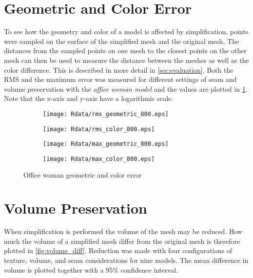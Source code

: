 \section{Geometric and Color Error}
To see how the geometry and color of a model is affected by simplification, points were sampled on the surface of the simplified mesh and the original mesh. The distances from the sampled points on one mesh to the closest points on the other mesh can then be used to measure the distance between the meshes as well as the color difference. This is described in more detail in \cref{sec:evaluation}. Both the RMS and the maximum error was measured for different settings of seam and volume preservation with the \emph{office woman model} and the values are plotted in \cref{fig:geo_col_error}. Note that the x-axis and y-axis have a logarithmic scale.

\begin{figure}[ht]
  \centering
  \begin{subfigure}[b]{.49\textwidth}
    \texttt{[image: Rdata/rms\_geometric\_800.eps]}
  \end{subfigure}
  \hfill
  \begin{subfigure}[b]{.49\textwidth}
    \texttt{[image: Rdata/rms\_color\_800.eps]}
  \end{subfigure}

  \begin{subfigure}[b]{.49\textwidth}
    \texttt{[image: Rdata/max\_geometric\_800.eps]}
  \end{subfigure}
  \hfill
  \begin{subfigure}[b]{.49\textwidth}
    \texttt{[image: Rdata/max\_color\_800.eps]}
  \end{subfigure}
  \caption{Office woman geometric and color error}
  \label{fig:geo_col_error}
\end{figure}

\clearpage
        
\section{Volume Preservation}
When simplification is performed the volume of the mesh may be reduced. How much the volume of a simplified mesh differ from the original mesh is therefore plotted in \cref{fig:volume_diff}. Reduction was made with four configurations of texture, volume, and seam considerations for nine models. The mean difference in volume is plotted together with a 95\% confidence interval.

